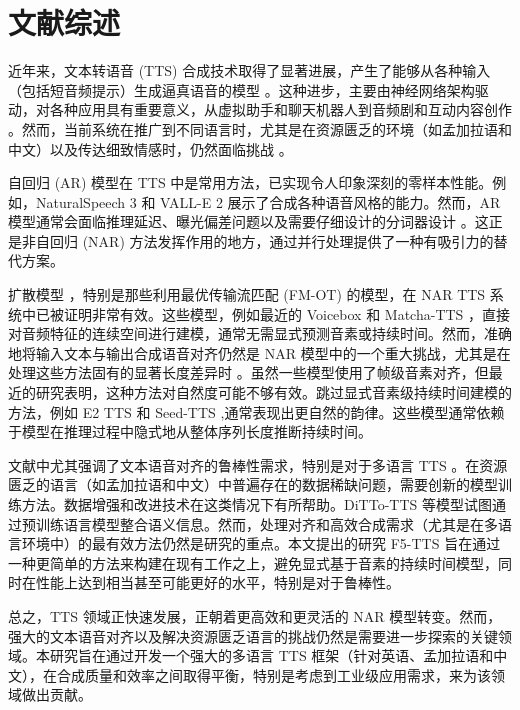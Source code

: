 \section*{文献综述}

近年来，文本转语音 (TTS) 合成技术取得了显著进展，产生了能够从各种输入（包括短音频提示）生成逼真语音的模型 \cite{shen2018naturalttssynthesisconditioning,ren2022fastspeech2fasthighquality,kim2020glowttsgenerativeflowtexttospeech,kim2021conditionalvariationalautoencoderadversarial} 。这种进步，主要由神经网络架构驱动，对各种应用具有重要意义，从虚拟助手和聊天机器人到音频剧和互动内容创作 \cite{hu2022neuraldubberdubbingvideos,liu2024m3tts} 。然而，当前系统在推广到不同语言时，尤其是在资源匮乏的环境（如孟加拉语和中文）以及传达细致情感时，仍然面临挑战 \cite{chen2024f5ttsfairytalerfakesfluent, eskimez2024e2ttsembarrassinglyeasy}。\newline

自回归 (AR) 模型在 TTS 中是常用方法，已实现令人印象深刻的零样本性能。例如，NaturalSpeech 3 \cite{ju2024naturalspeech3zeroshotspeech} 和 VALL-E 2 \cite{chen2024valle2neuralcodec} 展示了合成各种语音风格的能力。然而，AR 模型通常会面临推理延迟、曝光偏差问题以及需要仔细设计的分词器设计 \cite{song2024ellavstableneuralcodec, du2024valltdecoderonlygenerativetransducer, han2024vallerrobustefficient, peng2024voicecraftzeroshotspeechediting}。这正是非自回归 (NAR) 方法发挥作用的地方，通过并行处理提供了一种有吸引力的替代方案。\newline

扩散模型 \cite{ho2020denoisingdiffusionprobabilisticmodels}，特别是那些利用最优传输流匹配 (FM-OT) \cite{kornilov2024optimalflowmatchinglearning} 的模型，在 NAR TTS 系统中已被证明非常有效。这些模型，例如最近的 Voicebox \cite{le2023voiceboxtextguidedmultilingualuniversal} 和 Matcha-TTS \cite{mehta2024matchattsfastttsarchitecture}，直接对音频特征的连续空间进行建模，通常无需显式预测音素或持续时间。然而，准确地将输入文本与输出合成语音对齐仍然是 NAR 模型中的一个重大挑战，尤其是在处理这些方法固有的显著长度差异时 \cite{ju2024naturalspeech3zeroshotspeech}。虽然一些模型使用了帧级音素对齐，但最近的研究表明，这种方法对自然度可能不够有效。跳过显式音素级持续时间建模的方法，例如 E2 TTS \cite{eskimez2024e2ttsembarrassinglyeasy} 和 Seed-TTS \cite{anastassiou2024seedttsfamilyhighqualityversatile},通常表现出更自然的韵律。这些模型通常依赖于模型在推理过程中隐式地从整体序列长度推断持续时间。\newline

文献中尤其强调了文本语音对齐的鲁棒性需求，特别是对于多语言 TTS \cite{saeki2024extendingmultilingualspeechsynthesis}。在资源匮乏的语言（如孟加拉语和中文）中普遍存在的数据稀缺问题，需要创新的模型训练方法。数据增强和改进技术在这类情况下有所帮助。DiTTo-TTS \cite{lee2024dittottsefficientscalablezeroshot} 等模型试图通过预训练语言模型整合语义信息。然而，处理对齐和高效合成需求（尤其是在多语言环境中）的最有效方法仍然是研究的重点。本文提出的研究 F5-TTS \cite{chen2024f5ttsfairytalerfakesfluent} 旨在通过一种更简单的方法来构建在现有工作之上，避免显式基于音素的持续时间模型，同时在性能上达到相当甚至可能更好的水平，特别是对于鲁棒性。

总之，TTS 领域正快速发展，正朝着更高效和更灵活的 NAR 模型转变。然而，强大的文本语音对齐以及解决资源匮乏语言的挑战仍然是需要进一步探索的关键领域。本研究旨在通过开发一个强大的多语言 TTS 框架（针对英语、孟加拉语和中文），在合成质量和效率之间取得平衡，特别是考虑到工业级应用需求，来为该领域做出贡献。